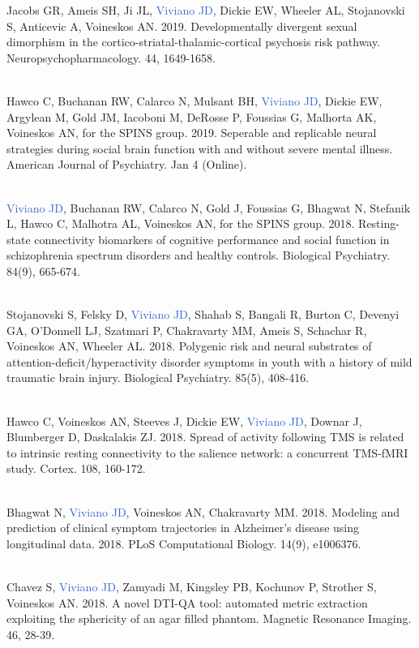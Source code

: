 \documentclass[a4paper,11pt,oneside]{book}
\begin{document}
\begin{flushleft}
Jacobs GR, Ameis SH, Ji JL, \textcolor{highlight}{Viviano JD}, Dickie EW, Wheeler AL, Stojanovski S, Anticevic A, Voineskos AN. 2019. Developmentally divergent sexual dimorphism in the cortico-striatal-thalamic-cortical psychosis risk pathway. Neuropsychopharmacology. 44, 1649-1658. \\\

Hawco C, Buchanan RW, Calarco N, Mulsant BH, \textcolor{highlight}{Viviano JD}, Dickie EW, Argylean M, Gold JM, Iacoboni M, DeRosse P, Foussias G, Malhorta AK, Voineskos AN, for the SPINS group. 2019. Seperable and replicable neural strategies during social brain function with and without severe mental illness. American Journal of Psychiatry. Jan 4 (Online). \\\

\textcolor{highlight}{Viviano JD}, Buchanan RW, Calarco N, Gold J, Foussias G, Bhagwat N, Stefanik L, Hawco C, Malhotra AL, Voineskos AN, for the SPINS group. 2018. Resting-state connectivity biomarkers of cognitive performance and social function in schizophrenia spectrum disorders and healthy controls. Biological Psychiatry. 84(9), 665-674.  \\\

Stojanovski S, Felsky D, \textcolor{highlight}{Viviano JD}, Shahab S, Bangali R, Burton C, Devenyi GA, O'Donnell LJ, Szatmari P, Chakravarty MM, Ameis S, Schachar R, Voineskos AN, Wheeler AL. 2018. Polygenic risk and neural substrates of attention-deficit/hyperactivity disorder symptoms in youth with a history of mild traumatic brain injury. Biological Psychiatry. 85(5), 408-416. \\\

Hawco C, Voineskos AN,  Steeves J, Dickie EW, \textcolor{highlight}{Viviano JD}, Downar J, Blumberger D, Daskalakis ZJ. 2018. Spread of activity following TMS is related to intrinsic resting connectivity to the salience network: a concurrent TMS-fMRI study. Cortex. 108, 160-172. \\\

Bhagwat N, \textcolor{highlight}{Viviano JD}, Voineskos AN, Chakravarty MM. 2018. Modeling and prediction of clinical symptom trajectories in Alzheimer's disease using longitudinal data. 2018. PLoS Computational Biology. 14(9), e1006376. \\\

Chavez S, \textcolor{highlight}{Viviano JD}, Zamyadi M, Kingsley PB, Kochunov P, Strother S, Voineskos AN. 2018. A novel DTI-QA tool: automated metric extraction exploiting the sphericity of an agar filled phantom. Magnetic Resonance Imaging. 46, 28-39. \\\


\end{flushleft}
\end{document}
